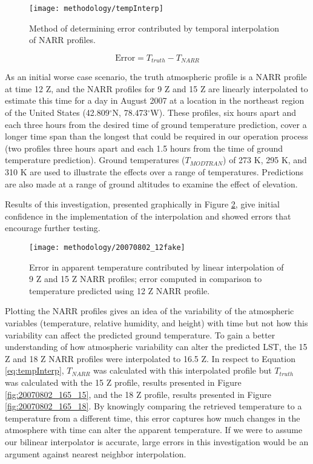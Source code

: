 \documentclass{book}
\begin{document}
\begin{figure}[H]
\centering
\texttt{[image: methodology/tempInterp]}
\caption{Method of determining error contributed by temporal interpolation of NARR profiles.}
\label{fig:tempInterp}
\end{figure}

\begin{equation}
\mbox{Error} = T_{truth} - T_{NARR}
\label{eq:tempInterp}
\end{equation}

As an initial worse case scenario, the truth atmospheric profile is a NARR profile at time 12 Z, and the NARR profiles for 9 Z and 15 Z are linearly interpolated to estimate this time for a day in August 2007 at a location in the northeast region of the United States (42.809$^\circ$N, 78.473$^\circ$W).  These profiles, six hours apart and each three hours from the desired time of ground temperature prediction, cover a longer time span than the longest that could be required in our operation process (two profiles three hours apart and each 1.5 hours from the time of ground temperature prediction).  Ground temperatures ($T_{MODTRAN}$) of 273 K, 295 K, and 310 K are used to illustrate the effects over a range of temperatures.  Predictions are also made at a range of ground altitudes to examine the effect of elevation.

Results of this investigation, presented graphically in Figure \ref{fig:20070802_12fake}, give initial confidence in the implementation of the interpolation and showed errors that encourage further testing.

\begin{figure}[H]
\centering
\texttt{[image: methodology/20070802\_12fake]}
\caption{Error in apparent temperature contributed by linear interpolation of 9 Z and 15 Z NARR profiles; error computed in comparison to temperature predicted using 12 Z NARR profile.}
\label{fig:20070802_12fake}
\end{figure}

Plotting the NARR profiles gives an idea of the variability of the atmospheric variables (temperature, relative humidity, and height) with time but not how this variability can affect the predicted ground temperature.  To gain a better understanding of how atmospheric variability can alter the predicted LST, the 15 Z and 18 Z NARR profiles were interpolated to 16.5 Z.  In respect to Equation \ref{eq:tempInterp}, $T_{NARR}$ was calculated with this interpolated profile but $T_{truth}$ was calculated with the 15 Z profile, results presented in Figure \ref{fig:20070802_165_15}, and the 18 Z profile, results presented in Figure \ref{fig:20070802_165_18}.  By knowingly comparing the retrieved temperature to a temperature from a different time, this error captures how much changes in the atmosphere with time can alter the apparent temperature.  If we were to assume our bilinear interpolator is accurate, large errors in this investigation would be an argument against nearest neighbor interpolation.
\end{document}
